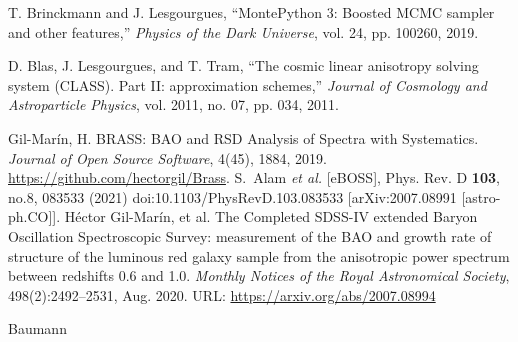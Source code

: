 \begin{thebibliography}{999}


T. Brinckmann and J. Lesgourgues, ``MontePython 3: Boosted MCMC sampler and other features,'' \textit{Physics of the Dark Universe}, vol. 24, pp. 100260, 2019.

D. Blas, J. Lesgourgues, and T. Tram, ``The cosmic linear anisotropy solving system (CLASS). Part II: approximation schemes,'' \textit{Journal of Cosmology and Astroparticle Physics}, vol. 2011, no. 07, pp. 034, 2011.

 Gil-Marín, H. BRASS: BAO and RSD Analysis of Spectra with Systematics. \textit{Journal of Open Source Software}, 4(45), 1884, 2019. \url{https://github.com/hectorgil/Brass}.
S.~Alam \textit{et al.} [eBOSS],
Phys. Rev. D \textbf{103}, no.8, 083533 (2021)
doi:10.1103/PhysRevD.103.083533
[arXiv:2007.08991 [astro-ph.CO]].
Héctor Gil-Marín, et al.
\newblock The Completed {SDSS}-{IV} extended Baryon Oscillation Spectroscopic Survey: measurement of the {BAO} and growth rate of structure of the luminous red galaxy sample from the anisotropic power spectrum between redshifts 0.6 and 1.0.
\newblock \emph{Monthly Notices of the Royal Astronomical Society}, 498(2):2492--2531, Aug. 2020.
\newblock URL: \url{https://arxiv.org/abs/2007.08994}


Baumann



\end{thebibliography}
